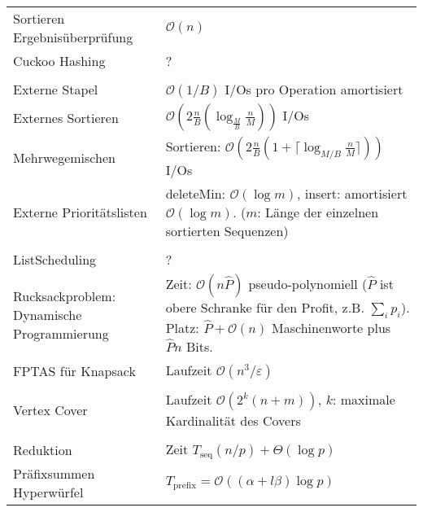 \documentclass[11pt]{scrartcl}
\begin{document}
\begin{xltabular}{\linewidth}{p{60mm}p{80mm}}
    \hline
    \vspace{-1em} & \\ 
    \hline
    Sortieren Ergebnisüberprüfung &
    $\mathcal{O}(n)$ \\
    \hline
    Cuckoo Hashing &
    ? \\
    \hline
    \vspace{-1em} & \\ 
    \hline
    Externe Stapel &
    $\mathcal{O}(1 / B)$ I/Os pro Operation amortisiert \\
    \hline
    Externes Sortieren &
    $\mathcal{O}(2 \frac{n}{B} (\log_\frac{M}{B} \frac{n}{M} ))$ I/Os\\
    \hline
    Mehrwegemischen &
    Sortieren: $\mathcal{O}(2 \frac{n}{B} (1 + \lceil \log_{M/B} \frac{n}{M} \rceil))$ I/Os\\
    \hline
    Externe Prioritätslisten &
    deleteMin: $\mathcal{O}(\log m)$, insert: amortisiert $\mathcal{O}(\log m)$. ($m$: Länge der 
    einzelnen sortierten Sequenzen) \\
    \hline
    \vspace{-1em} & \\ 
    \hline
    ListScheduling &
    ? \\
    \hline
    Rucksackproblem: Dynamische Programmierung &
    Zeit: $\mathcal{O}(n \hat{P})$ pseudo-polynomiell ($\hat{P}$ ist obere Schranke für den Profit,
    z.B. $\sum_i p_i$). Platz: $\hat{P} + \mathcal{O}(n)$ Maschinenworte plus $\hat{P} n$ Bits. \\
    \hline
    FPTAS für Knapsack &
    Laufzeit $\mathcal{O}(n^3 / \varepsilon) $ \\
    \hline
    \vspace{-1em} & \\ 
    \hline
    Vertex Cover &
    Laufzeit $\mathcal{O}(2^k(n + m))$, $k$: maximale Kardinalität des Covers \\
    \hline
    \vspace{-1em} & \\ 
    \hline
    Reduktion &
    Zeit $T_\mathrm{seq}(n/p) + \Theta(\log p)$ \\
    \hline
    Präfixsummen Hyperwürfel &
    $T_\mathrm{prefix} = \mathcal{O}((\alpha + l \beta) \log p)$ \\
    \hline

\end{xltabular}
\end{document}

